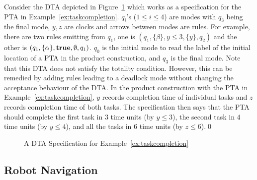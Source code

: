 \begin{example}\label{ex:taskcompletiondta}
Consider the DTA depicted in Figure~\ref{fig:dtataskcompletion} which works as a specification for the PTA in Example~\ref{ex:taskcompletion}.
$q_i$'s ($1\le i\le 4$) are modes with $q_3$ being the final mode, $y,z$ are clocks and arrows between modes are rules.
For example, there are two rules emitting from $q_1$, one is $(q_1, \{\beta\}, y\le 3, \{y\}, q_2)$ and the other is
$(q_1, \{\alpha\}, \mathbf{true},\emptyset, q_1)$.
$q_0$ is the initial mode to read the label of the initial location of a PTA in the product construction, and
$q_3$ is the final mode.
Note that this DTA does not satisfy the totality condition. However, this can be remedied by adding rules leading to a deadlock mode without changing the acceptance behaviour of the DTA.
In the product construction with the PTA in Example~\ref{ex:taskcompletion}, $y$ records completion time of individual tasks and $z$ records completion time of both tasks.
The specification then says that the PTA should complete the first task in $3$ time units (by $y\le 3$), the second task in $4$ time units (by $y\le 4$), and all the tasks in $6$ time units (by $z\le 6$).\qed
\end{example}

\begin{figure}
\centering
{}
\caption{A DTA Specification for Example~\ref{ex:taskcompletion}}
\label{fig:dtataskcompletion}
\end{figure}

\vspace{-1em}
\subsection{Robot Navigation}
\vspace{-0.5em}

